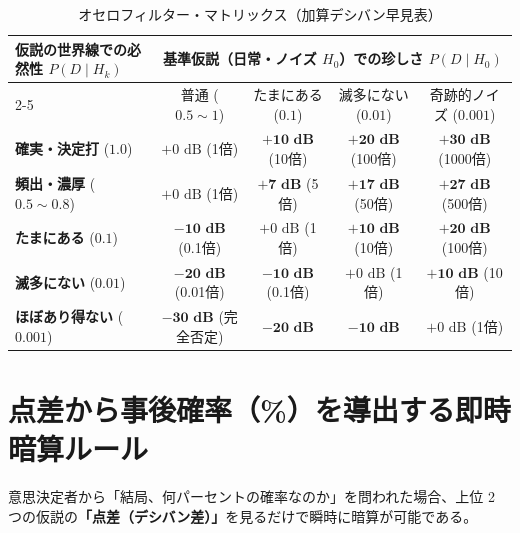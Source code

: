 \begin{table}[htbp]
  \caption{オセロフィルター・マトリックス（加算デシバン早見表）}
  \label{tab:othello_filter_matrix_v2}
  \vspace{2mm}
  \begin{tabular}{lcccc}
    \toprule
    \multirow{2}{*}{仮説の世界線での必然性 $P(D \mid H_k)$} & \multicolumn{4}{c}{基準仮説（日常・ノイズ $H_0$）での珍しさ $P(D \mid H_0)$} \\
    \cmidrule(lr){2-5}
    & 普通 ($0.5 \sim 1$) & たまにある ($0.1$) & 滅多にない ($0.01$) & 奇跡的ノイズ ($0.001$) \\
    \midrule
    \textbf{確実・決定打} ($1.0$)   & $+0\text{ dB}$ (1倍)   & $\mathbf{+10\text{ dB}}$ (10倍) & $\mathbf{+20\text{ dB}}$ (100倍) & $\mathbf{+30\text{ dB}}$ (1000倍) \\
    \textbf{頻出・濃厚} ($0.5 \sim 0.8$) & $+0\text{ dB}$ (1倍)   & $\mathbf{+7\text{ dB}}$ (5倍)   & $\mathbf{+17\text{ dB}}$ (50倍)  & $\mathbf{+27\text{ dB}}$ (500倍)  \\
    \textbf{たまにある} ($0.1$)     & $\mathbf{-10\text{ dB}}$ (0.1倍) & $+0\text{ dB}$ (1倍)   & $\mathbf{+10\text{ dB}}$ (10倍)  & $\mathbf{+20\text{ dB}}$ (100倍)  \\
    \textbf{滅多にない} ($0.01$)    & $\mathbf{-20\text{ dB}}$ (0.01倍)& $\mathbf{-10\text{ dB}}$ (0.1倍)& $+0\text{ dB}$ (1倍)    & $\mathbf{+10\text{ dB}}$ (10倍)  \\
    \textbf{ほぼあり得ない} ($0.001$)& $\mathbf{-30\text{ dB}}$ (完全否定)& $\mathbf{-20\text{ dB}}$      & $\mathbf{-10\text{ dB}}$        & $+0\text{ dB}$ (1倍)    \\
    \bottomrule
  \end{tabular}
\end{table}

\section{点差から事後確率（\%）を導出する即時暗算ルール}

意思決定者から「結局、何パーセントの確率なのか」を問われた場合、上位 2 つの仮説の\textbf{「点差（デシバン差）」}を見るだけで瞬時に暗算が可能である。

